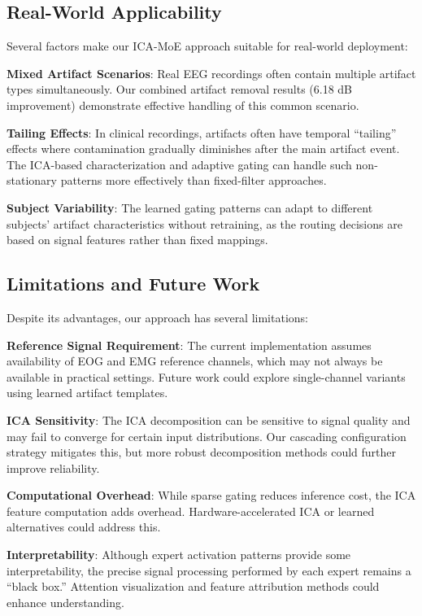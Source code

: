 \documentclass{article}
\begin{document}
\subsection{Real-World Applicability}

Several factors make our ICA-MoE approach suitable for real-world deployment:

\textbf{Mixed Artifact Scenarios}: Real EEG recordings often contain multiple artifact types simultaneously. Our combined artifact removal results (6.18 dB improvement) demonstrate effective handling of this common scenario.

\textbf{Tailing Effects}: In clinical recordings, artifacts often have temporal ``tailing'' effects where contamination gradually diminishes after the main artifact event. The ICA-based characterization and adaptive gating can handle such non-stationary patterns more effectively than fixed-filter approaches.

\textbf{Subject Variability}: The learned gating patterns can adapt to different subjects' artifact characteristics without retraining, as the routing decisions are based on signal features rather than fixed mappings.

\subsection{Limitations and Future Work}

Despite its advantages, our approach has several limitations:

\textbf{Reference Signal Requirement}: The current implementation assumes availability of EOG and EMG reference channels, which may not always be available in practical settings. Future work could explore single-channel variants using learned artifact templates.

\textbf{ICA Sensitivity}: The ICA decomposition can be sensitive to signal quality and may fail to converge for certain input distributions. Our cascading configuration strategy mitigates this, but more robust decomposition methods could further improve reliability.

\textbf{Computational Overhead}: While sparse gating reduces inference cost, the ICA feature computation adds overhead. Hardware-accelerated ICA or learned alternatives could address this.

\textbf{Interpretability}: Although expert activation patterns provide some interpretability, the precise signal processing performed by each expert remains a ``black box.'' Attention visualization and feature attribution methods could enhance understanding.
\end{document}
